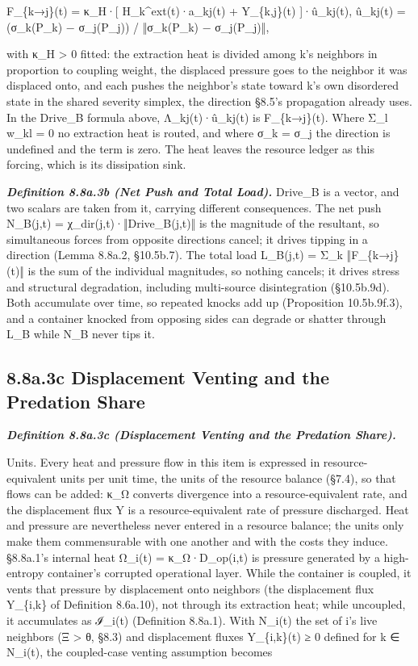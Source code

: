 \documentclass[
]{article}
\begin{document}
F\_\{k→j\}(t) = κ\_H·{[} H\_k\^{}ext(t)·a\_kj(t) + Y\_\{k,j\}(t)
{]}·û\_kj(t), û\_kj(t) = (σ\_k(P\_k) − σ\_j(P\_j)) / ‖σ\_k(P\_k) −
σ\_j(P\_j)‖,

with κ\_H \textgreater{} 0 fitted: the extraction heat is divided among
k's neighbors in proportion to coupling weight, the displaced pressure
goes to the neighbor it was displaced onto, and each pushes the
neighbor's state toward k's own disordered state in the shared severity
simplex, the direction §8.5's propagation already uses. In the Drive\_B
formula above, Λ\_kj(t)·û\_kj(t) is F\_\{k→j\}(t). Where Σ\_l w\_kl = 0
no extraction heat is routed, and where σ\_k = σ\_j the direction is
undefined and the term is zero. The heat leaves the resource ledger as
this forcing, which is its dissipation sink.

\emph{\textbf{Definition 8.8a.3b (Net Push and Total Load).}} Drive\_B
is a vector, and two scalars are taken from it, carrying different
consequences. The net push N\_B(j,t) = χ\_dir(j,t)·‖Drive\_B(j,t)‖ is
the magnitude of the resultant, so simultaneous forces from opposite
directions cancel; it drives tipping in a direction (Lemma 8.8a.2,
§10.5b.7). The total load L\_B(j,t) = Σ\_k ‖F\_\{k→j\}(t)‖ is the sum of
the individual magnitudes, so nothing cancels; it drives stress and
structural degradation, including multi-source disintegration
(§10.5b.9d). Both accumulate over time, so repeated knocks add up
(Proposition 10.5b.9f.3), and a container knocked from opposing sides
can degrade or shatter through L\_B while N\_B never tips it.

\hypertarget{a.3c-displacement-venting-and-the-predation-share}{%
\subsection{8.8a.3c Displacement Venting and the Predation
Share}\label{a.3c-displacement-venting-and-the-predation-share}}

\emph{\textbf{Definition 8.8a.3c (Displacement Venting and the Predation
Share).}}

Units. Every heat and pressure flow in this item is expressed in
resource-equivalent units per unit time, the units of the resource
balance (§7.4), so that flows can be added: κ\_Ω converts divergence
into a resource-equivalent rate, and the displacement flux Y is a
resource-equivalent rate of pressure discharged. Heat and pressure are
nevertheless never entered in a resource balance; the units only make
them commensurable with one another and with the costs they induce.
§8.8a.1's internal heat Ω\_i(t) = κ\_Ω·D\_op(i,t) is pressure generated
by a high-entropy container's corrupted operational layer. While the
container is coupled, it vents that pressure by displacement onto
neighbors (the displacement flux Y\_\{i,k\} of Definition 8.6a.10), not
through its extraction heat; while uncoupled, it accumulates as ℐ\_i(t)
(Definition 8.8a.1). With N\_i(t) the set of i's live neighbors (Ξ
\textgreater{} θ, §8.3) and displacement fluxes Y\_\{i,k\}(t) ≥ 0
defined for k ∈ N\_i(t), the coupled-case venting assumption becomes
\end{document}
